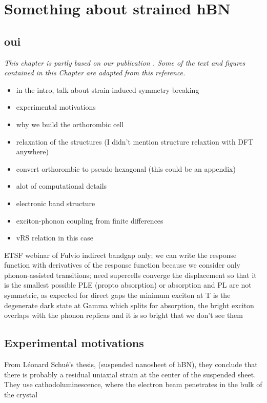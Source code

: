 \chapter{Something about strained hBN}
\chaptertoc{}

\section{oui}
\textit{This chapter is partly based on our publication \cite{lechifflart2022excitons}. Some of the text and figures contained in this Chapter are adapted from this reference. }
\begin{itemize}
	\item in the intro, talk about strain-induced symmetry breaking
	\item experimental motivations
	\item why we build the orthorombic cell 
	\item relaxation of the structures (I didn't mention structure relaxtion with DFT anywhere)
	\item convert orthorombic to pseudo-hexagonal (this could be an appendix)
	\item alot of computational details
	\item electronic band structure 
	\item exciton-phonon coupling from finite differences
	\item vRS relation in this case 
\end{itemize}
%
%
ETSF webinar of Fulvio
indirect bandgap only; we can write the response function with derivatives of the response function because we consider only phonon-assisted transitions; need supercells
converge the displacement so that it is the smallest possible
PLE (propto absorption) or absorption and PL are not symmetric, as expected for direct gaps
the minimum exciton at T is the degenerate dark state at Gamma which splits
for absorption, the bright exciton overlaps with the phonon replicas and it is so bright that we don't see them 

%
\section{Experimental motivations}
From Léonard Schué's thesis, (suspended nanosheet of hBN), they conclude that there is probably a residual uniaxial strain at the center of the suspended sheet. They use cathodoluminescence, where the electron beam penetrates in the bulk of the crystal

